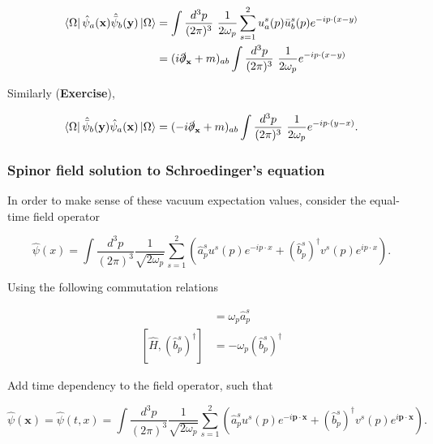 \begin{align}
\bra{\Omega} \hat{\psi}_a (\textbf{x}) \hat{\bar{\psi}}_b (\textbf{y}) \ket{\Omega} &= \int \frac{d^3 p}{(2 \pi)^3} \,\, \frac{1}{2 \omega_p} \sum_{s=1}^2 u^s_a (p) \bar{u}_b^s (p) e^{-i p \cdot (x - y)} \\
&= (i \slashed{\partial}_{\textbf{x}} + m)_{ab} \int \frac{d^3 p}{(2 \pi)^3} \,\, \frac{1}{2 \omega_p} e^{-i p \cdot (x-y)} \\
\end{align}

\noindent Similarly (\textbf{Exercise}),

\begin{equation}
\bra{\Omega} \hat{\bar{\psi}}_b (\textbf{y}) \hat{\psi}_a(\textbf{x}) \ket{\Omega} = (-i \slashed{\partial} _{\textbf{x}}+ m)_{ab} \int \frac{d^3 p}{(2 \pi)^3} \,\, \frac{1}{2 \omega_p} e^{-i p \cdot (y-x)}.
\end{equation}

\subsubsection*{Spinor field solution to Schroedinger's equation}

\noindent In order to make sense of these vacuum expectation values, consider the equal-time field operator

\begin{equation}
\hat{\psi} (x) = \int \frac{d^3 p}{(2 \pi)^3} \frac{1}{\sqrt{2 \omega_p}} \sum_{s=1}^2 \left( \hat{a}_p^s u^s (p) e^{-i p \cdot x} + (\hat{b}_p^s)^\dagger v^s (p) e^{i p \cdot x} \right).
\end{equation}

\noindent Using the following commutation relations

\begin{align}
[ \hat{H}, \hat{a}_p^s ] &= \omega_p \hat{a}_p^s \\
[ \hat{H}, (\hat{b}_p^s)^\dagger ] &= - \omega_p (\hat{b}_p^s)^\dagger 
\end{align}

\noindent Add time dependency to the field operator, such that

\begin{equation}
\hat{\psi} (\textbf{x}) = \hat{\psi} (t, x) = \int \frac{d^3 p}{(2 \pi)^3} \frac{1}{\sqrt{2 \omega_p}} \sum_{s=1}^2 \left( \hat{a}_p^s u^s (p) e^{-i \textbf{p} \cdot \textbf{x}} + (\hat{b}_p^s)^\dagger v^s (p) e^{i \textbf{p} \cdot \textbf{x}} \right).
\end{equation}

